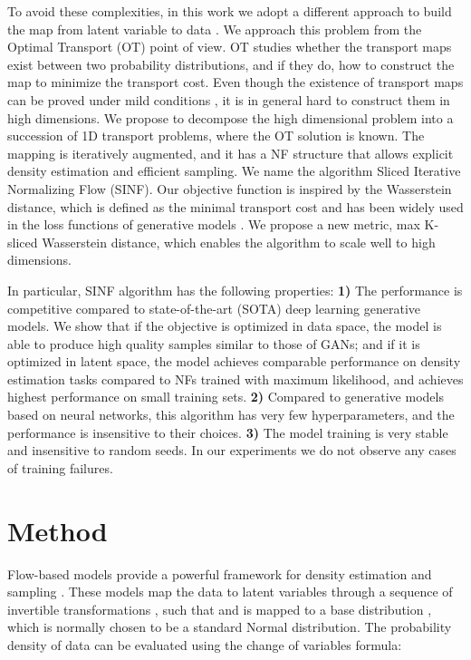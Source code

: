 \documentclass{article}
\begin{document}
To avoid these complexities, in this work we adopt a different approach to build the map from latent variable  to data . We approach this problem from the Optimal Transport (OT) point of view. OT studies whether the transport maps exist between two probability distributions, and if they do, how to construct the map to minimize the transport cost. Even though the existence of transport maps can be proved under mild conditions \citep{villani2008optimal}, it is in general hard to construct them in high dimensions. We propose to decompose the high dimensional problem into a succession of 1D transport problems, where the OT solution is known. The mapping is iteratively augmented, and it has a NF structure that allows explicit density estimation and efficient sampling. We name the algorithm Sliced Iterative Normalizing Flow (SINF). Our objective function is inspired by the Wasserstein distance, which is defined as the minimal transport cost and has been widely used in the loss functions of generative models \citep{arjovsky2017towards, tolstikhin2017wasserstein}. We propose a new metric, max K-sliced Wasserstein distance, which enables the algorithm to scale well to high dimensions. 

In particular, SINF algorithm has the following properties: \newline
    \textbf{1)} The performance is competitive compared to state-of-the-art (SOTA) deep learning generative models. We show that if the objective is optimized in data space, the model is able to produce high quality samples similar to those of GANs; and if it is optimized in latent space, the model achieves comparable performance on density estimation tasks compared to NFs trained with maximum likelihood, and achieves highest performance on small training sets.\newline
    \textbf{2)} Compared to generative models based on neural networks, this algorithm has very few hyperparameters, and the performance is insensitive to their choices. \newline
    \textbf{3)} The model training is very stable and insensitive to random seeds. In our experiments we do not observe any cases of training failures. \newline 


\section{Method}



Flow-based models provide a powerful framework for density estimation \citep{dinh2016density, papamakarios2017masked}
and sampling \citep{kingma2018glow}. These models map the data  to latent variables  through a sequence of invertible transformations , such that  and  is mapped to a base distribution , which is normally chosen to be a standard Normal distribution. The probability density of data  can be evaluated using the change of variables formula:
\end{document}
